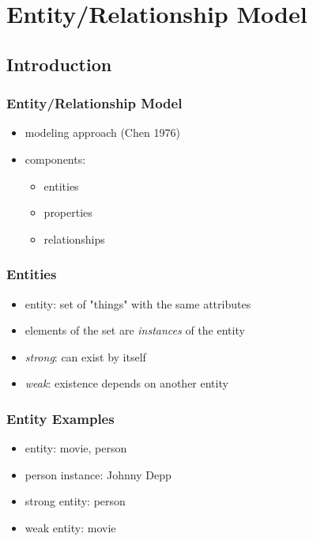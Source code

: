 \documentclass[dvipsnames]{beamer}
\begin{document}
\section{Entity/Relationship Model}

\subsection{Introduction}

\begin{frame}
  \frametitle{Entity/Relationship Model}

  \begin{itemize}
    \item modeling approach (Chen 1976)

    \medskip
    \item components:
    \begin{itemize}
      \item entities
      \item properties
      \item relationships
    \end{itemize}
  \end{itemize}
\end{frame}

\begin{frame}
  \frametitle{Entities}

  \begin{itemize}
    \item \alert{entity}: set of "things" with the same attributes
    \item elements of the set are \emph{instances} of the entity

    \medskip
    \item \emph{strong}: can exist by itself
    \item \emph{weak}: existence depends on another entity
  \end{itemize}
\end{frame}

\begin{frame}
  \frametitle{Entity Examples}

  \begin{itemize}
    \item entity: movie, person
    \item person instance: Johnny Depp

    \pause
    \medskip
    \item strong entity: person
    \item weak entity: movie
  \end{itemize}
\end{frame}
\end{document}
